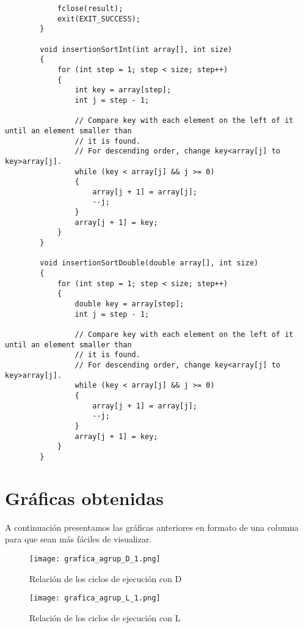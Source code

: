 \documentclass[a4paper,twocolumn]{article}
\begin{document}
\begin{lstlisting}
            fclose(result);
            exit(EXIT_SUCCESS);
        }
        
        void insertionSortInt(int array[], int size)
        {
            for (int step = 1; step < size; step++)
            {
                int key = array[step];
                int j = step - 1;
        
                // Compare key with each element on the left of it until an element smaller than
                // it is found.
                // For descending order, change key<array[j] to key>array[j].
                while (key < array[j] && j >= 0)
                {
                    array[j + 1] = array[j];
                    --j;
                }
                array[j + 1] = key;
            }
        }
        
        void insertionSortDouble(double array[], int size)
        {
            for (int step = 1; step < size; step++)
            {
                double key = array[step];
                int j = step - 1;
        
                // Compare key with each element on the left of it until an element smaller than
                // it is found.
                // For descending order, change key<array[j] to key>array[j].
                while (key < array[j] && j >= 0)
                {
                    array[j + 1] = array[j];
                    --j;
                }
                array[j + 1] = key;
            }
        }
\end{lstlisting}
\newpage

\section{Gráficas obtenidas}

A continuación presentamos las gráficas anteriores en  formato de una columna para que sean más fáciles de visualizar. \\

\setcounter{figure}{0}   
\label{graficas}
	\begin{figure}[!ht]
        \centering
        \texttt{[image: grafica\_agrup\_D\_1.png]}
        \caption{Relación de los ciclos de ejecución con D}
            \label{Figura1}
    \end{figure}
	
	\begin{figure}[!ht]
        \centering
        \texttt{[image: grafica\_agrup\_L\_1.png]}
        \caption{Relación de los ciclos de ejecución con L}
        \label{Figura2}
    \end{figure}
    
\end{document}
